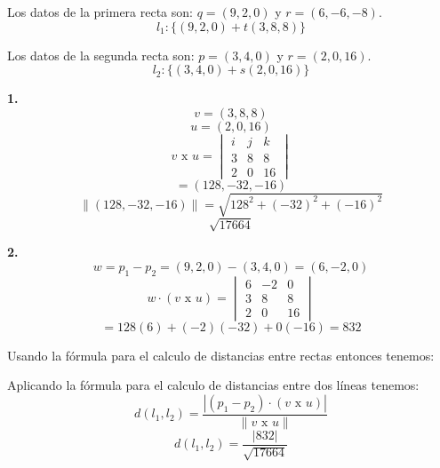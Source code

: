 \documentclass{article}
\begin{document}
Los datos de la primera recta son: $q = (9, 2, 0)$ y $r = (6, -6, -8)$.
$$l_1: \{(9,2,0)+t(3,8,8)\}$$

Los datos de la segunda recta son: $p = (3, 4, 0)$ y $r =(2, 0,16)$.
$$l_2: \{(3,4,0)+ s(2,0,16)\}$$

\begin{minipage}[c]{0.5cm}
    \textbf{1.}
    $$v = (3,8,8)$$
    $$u = (2,0,16)$$
    $$v \text{ x } u = \begin{vmatrix}
        i & j & k \\
        3 & 8 & 8\\
        2 & 0 & 16
    \end{vmatrix}$$
    $$=(128, -32, -16)$$
    $$\|(128, -32, -16)\| = \sqrt{128^2+ (-32)^2+(-16)^2}$$
    $$\sqrt{17664}$$
\end{minipage}\hspace*{7cm}\begin{minipage}[c]{0.5cm}
    \textbf{2.}
    $$w=p_1-p_2 =(9,2,0)-(3,4,0) =(6, -2, 0)$$
    $$w\cdot (v \text{ x } u) = \begin{vmatrix}
        6 & -2 & 0 \\
        3 & 8 & 8\\
        2 & 0 & 16
    \end{vmatrix}$$
    $$= 128(6)+(-2)(-32)+0(-16)= 832$$
\end{minipage}

Usando la fórmula para el calculo de distancias entre rectas entonces tenemos:

Aplicando la fórmula para el calculo de distancias entre dos líneas tenemos:
$$d(l_1,l_2) = \frac{\left|(p_1-p_2) \cdot(v \text{ x } u)\right|}{\|v \text{ x } u\|}$$
$$d(l_1,l_2) = \frac{\left|832\right|}{\sqrt{17664}}$$
\end{document}
